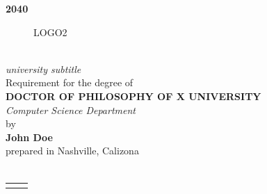 \documentclass[10pt]{book}
\begin{document}


\newlength{\plarg}
\setlength{\plarg}{8cm}
\newlength{\glarg}
\setlength{\glarg}{14cm}
\newlength{\Glarg}
\setlength{\Glarg}{15cm}

\begin{titlepage}
\thispagestyle{empty}

\vspace{-1cm}
\begin{minipage}{\glarg}
\vspace{-4.5cm}
{\color{light_gray}\large\hfill \bf 2040}
\end{minipage}
\vspace{-2cm}
\begin{figure}[htp]
\raisebox{14mm}{LOGO1}\hfill LOGO2
\end{figure}

\begin{center}
\begin{minipage}{\glarg}
\vspace{0.5cm}
\\ \vspace{0mm}\emph{\Large university subtitle}\\ \vspace{0.5cm}
{\Large Requirement for the degree of}\\ \vspace{2mm}
{\Large\bf DOCTOR OF PHILOSOPHY OF X UNIVERSITY}\\ \vspace{0.4cm}
\emph{\Large Computer Science Department}\\ \vspace{2mm}
{\Large by} \\ \vspace{3mm}
{\Huge\bf John Doe}\\ \vspace{0.4cm}
{\Large prepared in Nashville, Calizona}\vspace{0.3cm}
\\
\hspace{-20mm}{\rule{\Glarg}{1pt}}\\
\vspace{8mm}

\begin{tabular}{p{7cm}p{10cm}}
\begin{minipage}{\plarg}
\vspace{-4cm}
\hspace{-1.8cm}{\huge\bf The title of your thesis }\vspace{5mm}


\end{minipage}
\end{tabular}
\end{minipage}
\end{center}
\end{titlepage}
\end{document}
